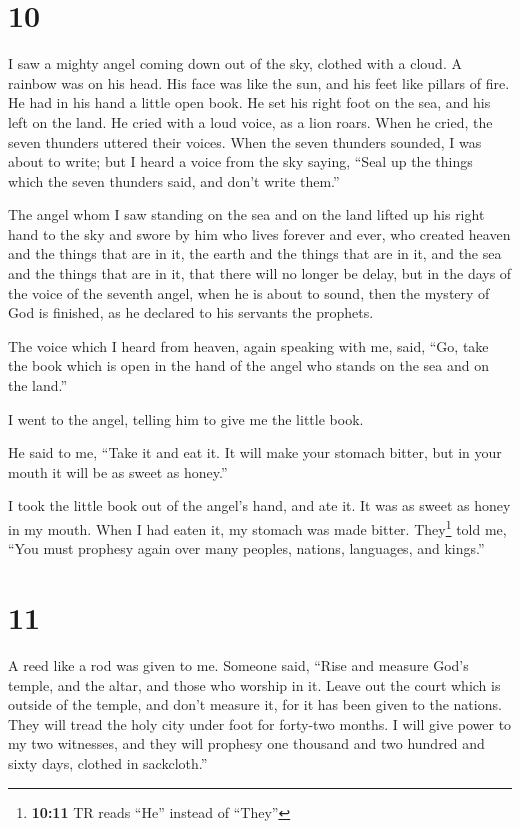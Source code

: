 \hypertarget{section-9}{%
\section{10}\label{section-9}}

 I saw a mighty angel coming down out of the sky, clothed
with a cloud. A rainbow was on his head. His face was like the sun, and
his feet like pillars of fire.  He had in his hand a
little open book. He set his right foot on the sea, and his left on the
land.  He cried with a loud voice, as a lion roars. When
he cried, the seven thunders uttered their voices.  When
the seven thunders sounded, I was about to write; but I heard a voice
from the sky saying, ``Seal up the things which the seven thunders said,
and don't write them.''

 The angel whom I saw standing on the sea and on the land
lifted up his right hand to the sky  and swore by him who
lives forever and ever, who created heaven and the things that are in
it, the earth and the things that are in it, and the sea and the things
that are in it, that there will no longer be delay,  but
in the days of the voice of the seventh angel, when he is about to
sound, then the mystery of God is finished, as he declared to his
servants the prophets.

 The voice which I heard from heaven, again speaking with
me, said, ``Go, take the book which is open in the hand of the angel who
stands on the sea and on the land.''

 I went to the angel, telling him to give me the little
book.

He said to me, ``Take it and eat it. It will make your stomach bitter,
but in your mouth it will be as sweet as honey.''

 I took the little book out of the angel's hand, and ate
it. It was as sweet as honey in my mouth. When I had eaten it, my
stomach was made bitter.  They\footnote{\textbf{10:11} TR
  reads ``He'' instead of ``They''} told me, ``You must prophesy again
over many peoples, nations, languages, and kings.''

\hypertarget{section-10}{%
\section{11}\label{section-10}}

 A reed like a rod was given to me. Someone said, ``Rise
and measure God's temple, and the altar, and those who worship in it.
 Leave out the court which is outside of the temple, and
don't measure it, for it has been given to the nations. They will tread
the holy city under foot for forty-two months.  I will
give power to my two witnesses, and they will prophesy one thousand and
two hundred and sixty days, clothed in sackcloth.''

